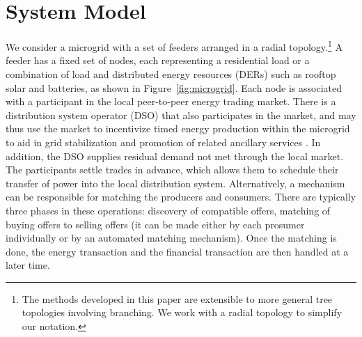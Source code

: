 
\section{System Model}
\label{sec:system}
We consider a microgrid with a set of feeders arranged in a radial topology.\footnote{The methods developed in this paper are extensible to more general tree topologies involving branching. We work with a radial topology to simplify our notation.} 
A feeder has a fixed set of nodes, each representing a residential load or a combination of load and distributed energy resources (DERs) such as rooftop solar and batteries, as shown in Figure~\ref{fig:microgrid}.
Each node is associated with a participant in the local peer-to-peer energy trading market. There is a distribution system operator (DSO) that also participates in the market, and may thus use the market to incentivize timed energy production within the microgrid to aid in grid stabilization and promotion of related ancillary services \cite{7462854}. In addition, the DSO supplies residual demand not met through the local market.
The participants settle trades in advance, which allows them to schedule their transfer of power into the local distribution system. Alternatively, a mechanism can be responsible for matching the producers and consumers. There are typically three phases in these operations: discovery of compatible offers, matching of buying offers to selling offers (it can be made either by each prosumer individually or by an automated matching mechanism). Once the matching is done, the energy transaction and the financial transaction are then handled at a later time. 






